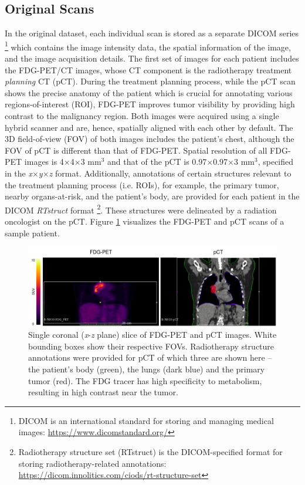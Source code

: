 \subsection{Original Scans}
\label{Original_Scans}
In the original dataset, each individual scan is stored as a separate DICOM series \footnote{DICOM is an international standard for storing and managing medical images: \url{https://www.dicomstandard.org/}} which contains the image intensity data, the spatial information of the image, and the image acquisition details. The first set of images for each patient includes the FDG-PET/CT images, whose CT component is the radiotherapy treatment \textit{planning} CT (pCT). During the treatment planning process, while the pCT scan shows the precise anatomy of the patient which is crucial for annotating various regions-of-interest (ROI), FDG-PET improves tumor visibility by providing high contrast to the malignancy region. Both images were acquired using a single hybrid scanner and are, hence, spatially aligned with each other by default. The 3D field-of-view (FOV) of both images includes the patient's chest, although the FOV of pCT is different than that of FDG-PET. Spatial resolution of all FDG-PET images is 4$\times$4$\times$3 mm$^3$ and that of the pCT is 0.97$\times$0.97$\times$3 mm$^3$, specified in the \textit{x}$\times$\textit{y}$\times$\textit{z} format. Additionally, annotations of certain structures relevant to the treatment planning process (i.e. ROIs), for example, the primary tumor, nearby organs-at-risk, and the patient's body, are provided for each patient in the DICOM \textit{RTstruct} format \footnote{Radiotherapy structure set (RTstruct) is the DICOM-specified format for storing radiotherapy-related annotations: \url{https://dicom.innolitics.com/ciods/rt-structure-set}}. These structures were delineated by a radiation oncologist on the pCT. Figure \ref{fig:original_fdgpet_pct} visualizes the FDG-PET and pCT scans of a sample patient.

\begin{figure}[h!]
    \centering
    \includegraphics[width=\linewidth]{figures/Data/original/N010-FDG_PET_pCT.png}
    \caption{Single coronal (\textit{x}-\textit{z} plane) slice of FDG-PET and pCT images. White bounding boxes show their respective FOVs. Radiotherapy structure annotations were provided for pCT of which three are shown here -- the patient's body (green), the lungs (dark blue) and the primary tumor (red). The FDG tracer has high specificity to metabolism, resulting in high contrast near the tumor.}
    \label{fig:original_fdgpet_pct}
\end{figure}

